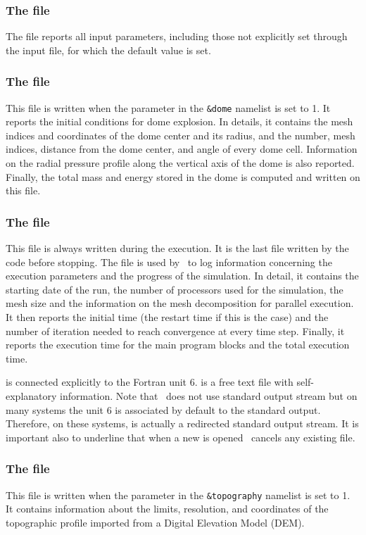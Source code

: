 \subsubsection{The  file}
The file  reports all input parameters, including
those not explicitly set through the input file, for which the
default value is set.

\subsubsection{The  file}
This file is written when the  parameter in the 
{\tt \&dome} namelist is set to 1.
It reports the initial conditions for dome explosion. In details,
it contains the mesh indices and coordinates of the dome center and its radius,
 and the number, mesh indices, distance from the dome center, and angle of every
dome cell. Information on the radial pressure profile along the
vertical axis of the dome is also reported.
Finally, the total mass and energy stored in the dome is computed and 
written on this file.

\subsubsection{The  file}
This file is always written during the execution. It is the last file
written by the code before stopping.
The file  is used by \PDAC\ to log information
concerning the execution parameters and the progress of the simulation. 
In detail, it contains the starting date of the run, the number of
processors used for the simulation, the mesh size and the information
on the mesh decomposition for parallel execution. It then reports
the initial time (the restart time if this is the case) and the
number of iteration needed to reach convergence at every time step.
Finally, it reports the execution time for the main program blocks
and the total execution time.

 is connected explicitly to the Fortran unit 6. 
 is a free text file with self-explanatory information.
Note that \PDAC\ does not use standard output stream but on many
systems the unit 6 is associated by default to the standard output. 
Therefore, on these systems,  is actually a redirected 
standard output stream.
It is important also to underline that when a new  is opened 
\PDAC\ cancels any existing  file.

\subsubsection{The  file}
This file is written when the  parameter in the 
{\tt \&topography} namelist is set to 1. It contains information
about the limits, resolution, and coordinates of the topographic
profile imported from a Digital Elevation Model (DEM). 

